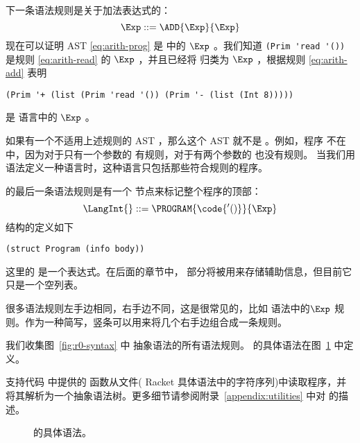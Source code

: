 \documentclass[11pt]{book}
\begin{document}
下一条语法规则是关于加法表达式的：
\begin{equation}
  \Exp ::= \ADD{\Exp}{\Exp} \label{eq:arith-add}
\end{equation}
现在可以证明 AST \eqref{eq:arith-prog} 是
\LangInt{} 中的 $\Exp$ 。我们知道 \lstinline{(Prim 'read '())} 是规则
\eqref{eq:arith-read} 的 $\Exp$ ，并且已经将  归类为 $\Exp$ ，根据规则 \eqref{eq:arith-add}
表明
\begin{lstlisting}
(Prim '+ (list (Prim 'read '()) (Prim '- (list (Int 8)))))
\end{lstlisting}
是 \LangInt{} 语言中的 $\Exp$ 。

如果有一个不适用上述规则的 AST ，那么这个 AST 就不是 \LangInt{} 。例如，程序 
不在 \LangInt{} 中，因为对于只有一个参数的 \code{+} 有规则，对于有两个参数的 \key{-} 也没有规则。 当我们用语法定义一种语言时，这种语言只包括那些符合规则的程序。

 \LangInt{} 的最后一条语法规则是有一个 节点来标记整个程序的顶部：
\[
  \LangInt{} ::= \PROGRAM{\code{'()}}{\Exp}
\]
  结构的定义如下
\begin{lstlisting}
(struct Program (info body))
\end{lstlisting}
这里的  是一个表达式。在后面的章节中，  部分将被用来存储辅助信息，但目前它只是一个空列表。

很多语法规则左手边相同，右手边不同，这是很常见的，比如 \LangInt{} 语法中的$\Exp$ 规则。作为一种简写，竖条可以用来将几个右手边组合成一条规则。

我们收集图~\ref{fig:r0-syntax} 中\LangInt{}
抽象语法的所有语法规则。 \LangInt{} 的具体语法在图~\ref{fig:r0-concrete-syntax} 中定义。

支持代码 中提供的  函数从文件( Racket 具体语法中的字符序列)中读取程序，并将其解析为一个抽象语法树。更多细节请参阅附录~\ref{appendix:utilities} 中对 的描述。


\begin{figure}[tp]
\caption{\LangInt{} 的具体语法。}
\label{fig:r0-concrete-syntax}
\end{figure}
\end{document}
